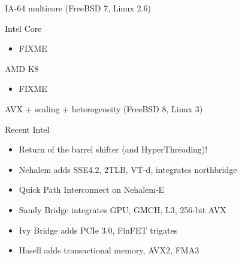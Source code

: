 \documentclass[mathserif,xcolor={dvipsnames,table}]{beamer}
\begin{document}
\begin{frame}[t]{IA-64 multicore (FreeBSD 7, Linux 2.6)}
\begin{block}{Intel Core}
\begin{itemize}
\item FIXME
\end{itemize}
\end{block}
\begin{block}{AMD K8}
\begin{itemize}
\item FIXME
\end{itemize}
\end{block}
\vfill
\begin{center}
\end{center}
\end{frame}

\begin{frame}[t]{AVX + scaling + heterogeneity (FreeBSD 8, Linux 3)}
\begin{block}{Recent Intel}
\begin{itemize}
\item Return of the barrel shifter (and HyperThreading)!
\item Nehalem adds SSE4.2, 2TLB, VT-d, integrates northbridge
\item Quick Path Interconnect on Nehalem-E
\item Sandy Bridge integrates GPU, GMCH, L3, 256-bit AVX
\item Ivy Bridge adds PCIe 3.0, FinFET trigates
\item Hasell adds transactional memory, AVX2, FMA3
\end{itemize}
\end{block}
\vfill
\begin{center}
\end{center}
\end{frame}
\end{document}

